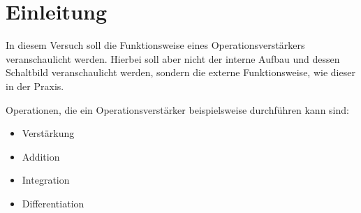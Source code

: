 \part{Einleitung}
In diesem Versuch soll die Funktionsweise eines Operationsverstärkers
veranschaulicht werden. Hierbei soll aber nicht der interne Aufbau und dessen 
Schaltbild veranschaulicht werden, sondern die externe Funktionsweise, wie 
dieser in der Praxis.

Operationen, die ein Operationsverstärker beispielsweise durchführen kann sind:
\begin{itemize}[noitemsep,nosep]
	\item Verstärkung
	\item Addition
	\item Integration
	\item Differentiation
\end{itemize}

